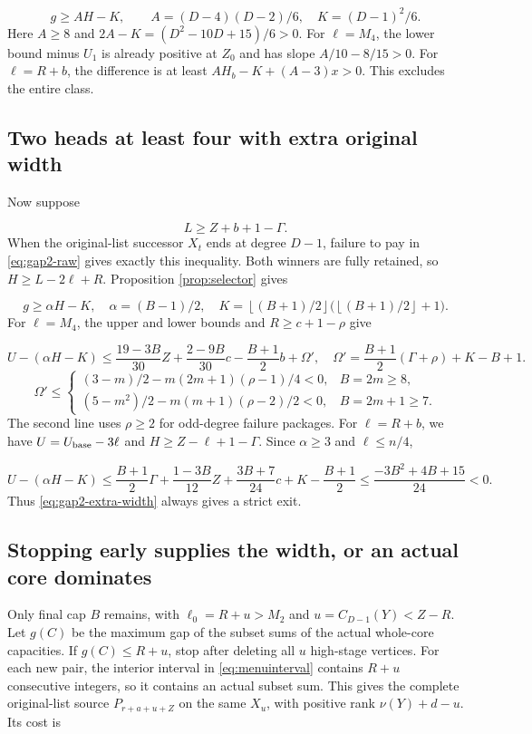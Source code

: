 \documentclass[11pt,a4paper]{article}
\newcommand{\floor}[1]{\left\lfloor#1\right\rfloor}
\theoremstyle{definition}
\begin{document}
\[
g\ge A H-K,\qquad
A=(D-4)(D-2)/6,\quad K=(D-1)^2/6.
\]
Here $A\ge8$ and $2A-K=(D^2-10D+15)/6>0$.
For $\ell=M_4$, the lower bound minus $U_1$ is already positive at $Z_0$
and has slope $A/10-8/15>0$.
For $\ell=R+b$, the difference is at least $AH_b-K+(A-3)x>0$.
This excludes the entire class.

\subsection{Two heads at least four with extra original width}
Now suppose

\begin{equation}\label{eq:gap2-extra-width}
L\ge Z+b+1-\Gamma.
\end{equation}
When the original-list successor $X_t$ ends at degree $D-1$,
failure to pay in \eqref{eq:gap2-raw} gives exactly this inequality.
Both winners are fully retained, so $H\ge L-2\ell+R$.
Proposition \ref{prop:selector} gives

\[
g\ge\alpha H-K,\quad
\alpha=(B-1)/2,\quad
K=\floor{(B+1)/2}\bigl(\floor{(B+1)/2}+1\bigr).
\]
For $\ell=M_4$, the upper and lower bounds and $R\ge c+1-\rho$ give

\[
U-(\alpha H-K)\le
\frac{19-3B}{30}Z+\frac{2-9B}{30}c-\frac{B+1}{2}b+\Omega',
\quad
\Omega'=\frac{B+1}{2}(\Gamma+\rho)+K-B+1.
\]
\[
\Omega'\le
\begin{cases}
(3-m)/2-m(2m+1)(\rho-1)/4<0,&B=2m\ge8,\\
(5-m^2)/2-m(m+1)(\rho-2)/2<0,&B=2m+1\ge7.
\end{cases}
\]
The second line uses $\rho\ge2$ for odd-degree failure packages.
For $\ell=R+b$, we have $U=U_{\rm base}-3\ell$ and
$H\ge Z-\ell+1-\Gamma$.
Since $\alpha\ge3$ and $\ell\le n/4$,

\[
U-(\alpha H-K)\le
\frac{B+1}{2}\Gamma+\frac{1-3B}{12}Z+
\frac{3B+7}{24}c+K-\frac{B+1}{2}
\le\frac{-3B^2+4B+15}{24}<0.
\]
Thus \eqref{eq:gap2-extra-width} always gives a strict exit.

\subsection{Stopping early supplies the width, or an actual core dominates}
Only final cap $B$ remains, with
$\ell_0=R+u>M_2$ and $u=C_{D-1}(Y)<Z-R$.
Let $g(C)$ be the maximum gap of the subset sums of the actual whole-core capacities.
If $g(C)\le R+u$, stop after deleting all $u$ high-stage vertices.
For each new pair, the interior interval in \eqref{eq:menuinterval}
contains $R+u$ consecutive integers, so it contains an actual subset sum.
This gives the complete original-list source $P_{r+a+u+Z}$ on the same $X_u$,
with positive rank $\nu(Y)+d-u$.
Its cost is
\end{document}

